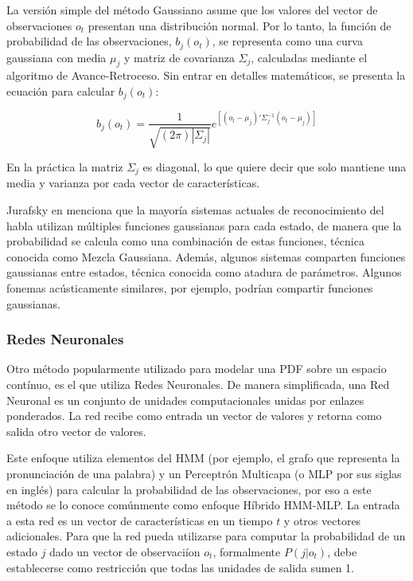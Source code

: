 La versi\'{o}n simple del m\'etodo Gaussiano asume que los valores del vector de observaciones $o_t$ presentan una distribuci\'on
normal. Por lo tanto, la funci\'on de probabilidad de las observaciones, $b_j(o_t)$, se representa como una curva gaussiana con
media $\mu_j$ y matriz de covarianza $\Sigma_j$, calculadas mediante el algoritmo de Avance-Retroceso. Sin entrar en detalles 
matem\'aticos, se presenta la ecuaci\'on para calcular $b_j(o_t)$:

\begin{equation}
    b_j(o_t) = \frac{1}{\sqrt{(2\pi)|\Sigma_j|}}e^{[(o_t-\mu_j)'\Sigma_j^{-1}(o_t-\mu_j)]}
\end{equation}

En la pr\'actica la matriz $\Sigma_j$ es diagonal, lo que quiere decir que solo mantiene una media y varianza por cada vector
de caracter\'isticas.

Jurafsky en \cite{Jurafsky} menciona que la mayor\'ia sistemas actuales de reconocimiento del habla utilizan m\'ultiples funciones gaussianas 
para cada estado, de manera que la probabilidad se calcula como una combinaci\'on de estas funciones, t\'ecnica conocida como
Mezcla Gaussiana. Adem\'as, algunos sistemas comparten funciones gaussianas entre estados, t\'ecnica conocida como atadura de
par\'ametros. Algunos fonemas ac\'usticamente similares, por ejemplo, podr\'ian compartir funciones gaussianas.

\subsubsection{Redes Neuronales}
\label{sec:likelihoodNeuralNet}

Otro m\'etodo popularmente utilizado para modelar una PDF sobre un espacio cont\'inuo, es el que utiliza Redes Neuronales. 
De manera simplificada, una Red Neuronal es un conjunto de unidades computacionales unidas por enlazes ponderados. La red recibe
como entrada un vector de valores y retorna como salida otro vector de valores.

Este enfoque utiliza elementos del HMM (por ejemplo, el grafo que representa la pronunciaci\'on de una palabra) y un Perceptr\'on
Multicapa (o MLP por sus siglas en ingl\'es) para calcular la probabilidad de las observaciones, por eso a este m\'etodo se lo
conoce com\'unmente como enfoque H\'ibrido HMM-MLP. La entrada a esta red es un vector de caracter\'isticas en un tiempo $t$ y
otros vectores adicionales. Para que la red pueda utilizarse para computar la probabilidad de un estado $j$ dado un vector
de observaci\'ion $o_t$, formalmente $P(j|o_t)$, debe establecerse como restricci\'on que todas las unidades de salida sumen 1.

